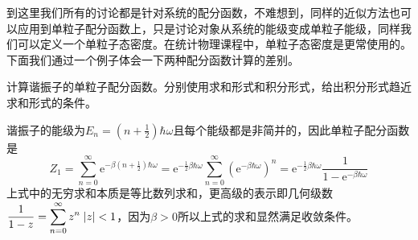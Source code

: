\documentclass[../../main.tex]{subfiles}
\begin{document}
到这里我们所有的讨论都是针对系统的配分函数，不难想到，同样的近似方法也可以应用到单粒子配分函数上，只是讨论对象从系统的能级变成单粒子能级，同样我们可以定义一个单粒子态密度。在统计物理课程中，单粒子态密度是更常使用的。下面我们通过一个例子体会一下两种配分函数计算的差别。
\begin{example}
    计算谐振子的单粒子配分函数。分别使用求和形式和积分形式，给出积分形式趋近求和形式的条件。
    \begin{solution}
        谐振子的能级为\(E_n=\left(n+\frac{1}{2}\right)\hbar\omega\)且每个能级都是非简并的，因此单粒子配分函数是
        \begin{equation}
            Z_1=\sum_{n=0}^{\infty} \mathrm{e}^{-\beta\left(n+\frac{1}{2}\right)\hbar\omega}=\mathrm{e}^{-\frac{1}{2}\beta\hbar\omega}\sum_{n=0}^{\infty}\left(\mathrm{e}^{-\beta\hbar\omega}\right)^n=\mathrm{e}^{-\frac{1}{2}\beta\hbar\omega}\frac{1}{1-\mathrm{e}^{-\beta\hbar\omega}}
        \end{equation}
        上式中的无穷求和本质是等比数列求和，更高级的表示即几何级数\(\displaystyle\frac{1}{1-z}=\sum_{n=0}^{\infty}z^n\;\abs{z}<1\)，因为\(\beta>0\)所以上式的求和显然满足收敛条件。


\end{solution}
\end{example}
\end{document}
